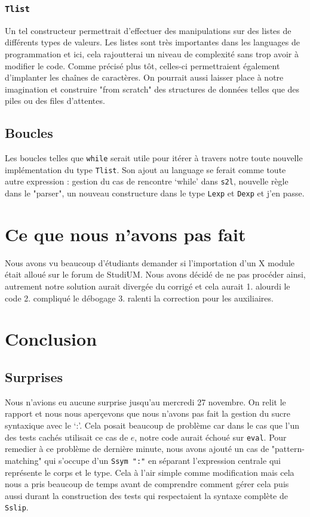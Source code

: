 \documentclass[a4paper,12pt]{article}
\begin{document}
        \subsubsection{\texttt{Tlist}}
            Un tel constructeur permettrait d'effectuer des manipulations sur des listes
            de différents types de valeurs. Les listes sont très importantes dans les 
            languages de programmation et ici, cela rajoutterai un niveau de complexité 
            sans trop avoir à modifier le code. Comme précisé plus tôt, celles-ci permettraient
            également d'implanter les chaînes de caractères. On pourrait aussi laisser
            place à notre imagination et construire "from scratch" des structures de données
            telles que des piles ou des files d'attentes.
    \subsection{Boucles}
        Les boucles telles que \texttt{while} serait utile pour itérer à travers notre toute 
        nouvelle implémentation du type \texttt{Tlist}. Son ajout au language se ferait comme 
        toute autre expression : gestion du cas de rencontre `while' dans \texttt{s2l}, nouvelle
        règle dans le "parser", un nouveau constructure dans le type \texttt{Lexp} et \texttt{Dexp}
        et j'en passe.

\section{Ce que nous n'avons pas fait}
    Nous avons vu beaucoup d'étudiants demander si l'importation d'un
    X module était alloué sur le forum de StudiUM. Nous avons décidé
    de ne pas procéder ainsi, autrement notre solution aurait divergée
    du corrigé et cela aurait 1. alourdi le code 2. compliqué le 
    débogage 3. ralenti la correction pour les auxiliaires.

\newpage
\section{Conclusion}
    \subsection{Surprises}
        Nous n'avions eu aucune surprise jusqu'au mercredi 27 novembre. On relit le 
        rapport et nous nous aperçevons que nous n'avons pas fait la gestion du sucre
        syntaxique avec le `:'. Cela posait beaucoup de problème car dans le cas que
        l'un des tests cachés utilisait ce cas de $e$, notre code aurait échoué sur
        \texttt{eval}. Pour remedier à ce problème de dernière minute, nous avons 
        ajouté un cas de "pattern-matching" qui s'occupe d'un \texttt{Ssym ":"} en 
        séparant l'expression centrale qui représente le corps et le type. Cela à
        l'air simple comme modification mais cela nous a pris beaucoup de temps avant
        de comprendre comment gérer cela puis aussi durant la construction des tests 
        qui respectaient la syntaxe complète de \texttt{Sslip}. \\
\end{document}
